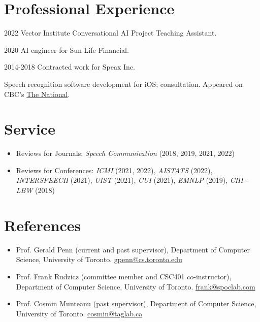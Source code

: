 \documentclass{article}
\begin{document}
\section{Professional Experience}

\begin{CV}
  \item[2022] Vector Institute Conversational AI Project Teaching Assistant.
  \item[2020] AI engineer for Sun Life Financial.
  \item[2014-2018] Contracted work for Speax Inc.

    Speech recognition software development for iOS; consultation. Appeared on
    CBC's \href{https://www.cbc.ca/player/play/1418433091867/}{The National}.

\end{CV}


\section{Service}

\begin{itemize}
  \item Reviews for Journals:%
    \textit{Speech Communication} (2018, 2019, 2021, 2022)
  \item Reviews for Conferences:%
    \textit{ICMI} (2021, 2022), \textit{AISTATS} (2022), \textit{INTERSPEECH}
    (2021), \textit{UIST} (2021), \textit{CUI} (2021), \textit{EMNLP} (2019),
    \textit{CHI - LBW} (2018)
\end{itemize}

\section{References}

\begin{itemize}
  \item Prof. Gerald Penn (current and past supervisor), Department of
    Computer Science, University of Toronto.
    \href{mailto:gpenn@cs.toronto.edu}{gpenn@cs.toronto.edu}
  \item Prof. Frank Rudzicz (committee member and CSC401 co-instructor),
    Department of Computer Science, University of Toronto.
    \href{mailto:frank@spoclab.com}{frank@spoclab.com}
  \item Prof. Cosmin Munteanu (past supervisor), Department of Computer Science,
    University of Toronto. \href{mailto:cosmin@taglab.ca}{cosmin@taglab.ca}
\end{itemize}
\end{document}
